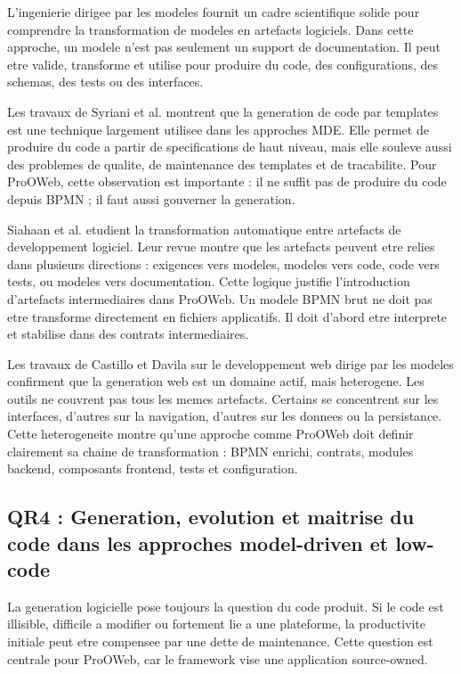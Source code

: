 \documentclass[12pt,a4paper]{article}
\begin{document}
L'ingenierie dirigee par les modeles fournit un cadre scientifique solide pour comprendre la transformation de modeles en artefacts logiciels. Dans cette approche, un modele n'est pas seulement un support de documentation. Il peut etre valide, transforme et utilise pour produire du code, des configurations, des schemas, des tests ou des interfaces.

Les travaux de Syriani et al. \cite{syriani2018} montrent que la generation de code par templates est une technique largement utilisee dans les approches MDE. Elle permet de produire du code a partir de specifications de haut niveau, mais elle souleve aussi des problemes de qualite, de maintenance des templates et de tracabilite. Pour ProOWeb, cette observation est importante : il ne suffit pas de produire du code depuis BPMN ; il faut aussi gouverner la generation.

Siahaan et al. \cite{siahaan2024} etudient la transformation automatique entre artefacts de developpement logiciel. Leur revue montre que les artefacts peuvent etre relies dans plusieurs directions : exigences vers modeles, modeles vers code, code vers tests, ou modeles vers documentation. Cette logique justifie l'introduction d'artefacts intermediaires dans ProOWeb. Un modele BPMN brut ne doit pas etre transforme directement en fichiers applicatifs. Il doit d'abord etre interprete et stabilise dans des contrats intermediaires.

Les travaux de Castillo et Davila \cite{castillo2024} sur le developpement web dirige par les modeles confirment que la generation web est un domaine actif, mais heterogene. Les outils ne couvrent pas tous les memes artefacts. Certains se concentrent sur les interfaces, d'autres sur la navigation, d'autres sur les donnees ou la persistance. Cette heterogeneite montre qu'une approche comme ProOWeb doit definir clairement sa chaine de transformation : BPMN enrichi, contrats, modules backend, composants frontend, tests et configuration.

\subsection{QR4 : Generation, evolution et maitrise du code dans les approches model-driven et low-code}

La generation logicielle pose toujours la question du code produit. Si le code est illisible, difficile a modifier ou fortement lie a une plateforme, la productivite initiale peut etre compensee par une dette de maintenance. Cette question est centrale pour ProOWeb, car le framework vise une application source-owned.
\end{document}
